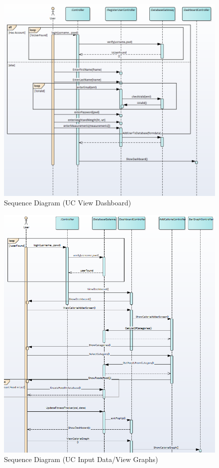 \documentclass[10pt]{article}
\begin{document}
\begin{figure}[h!]
	\begin{center}
		\includegraphics[width=\columnwidth]{UC2.png}
		\caption{{Sequence Diagram (UC View Dashboard)
				{\label{div-475015}}%
		}}
	\end{center}
\end{figure}


\begin{figure}[h!]
	\begin{center}
		\includegraphics[width=\columnwidth]{UC3.png}
		\caption{{Sequence Diagram (UC Input Data/View Graphs)
				{\label{div-885174}}%
		}}
	\end{center}
\end{figure}
\end{document}
